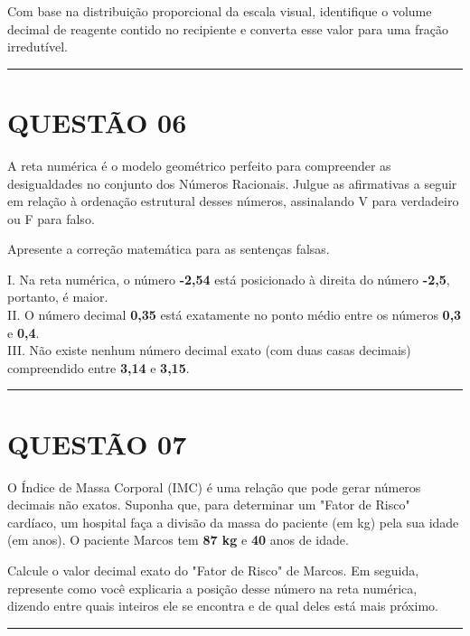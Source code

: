 \documentclass[12pt, a4paper]{article}
\begin{document}
Com base na distribuição proporcional da escala visual, identifique o volume decimal de reagente contido no recipiente e converta esse valor para uma fração irredutível.

\vspace{0.5cm} \noindent\rule{\textwidth}{0.4pt} \vspace{0.5cm}

\section*{QUESTÃO 06}

A reta numérica é o modelo geométrico perfeito para compreender as desigualdades no conjunto dos Números Racionais. Julgue as afirmativas a seguir em relação à ordenação estrutural desses números, assinalando V para verdadeiro ou F para falso.

Apresente a correção matemática para as sentenças falsas.

I. Na reta numérica, o número \textbf{-2,54} está posicionado à direita do número \textbf{-2,5}, portanto, é maior.\\[0.3cm]
II. O número decimal \textbf{0,35} está exatamente no ponto médio entre os números \textbf{0,3} e \textbf{0,4}.\\[0.3cm]
III. Não existe nenhum número decimal exato (com duas casas decimais) compreendido entre \textbf{3,14} e \textbf{3,15}.

\vspace{0.5cm} \noindent\rule{\textwidth}{0.4pt} \vspace{0.5cm}

\section*{QUESTÃO 07}

O Índice de Massa Corporal (IMC) é uma relação que pode gerar números decimais não exatos. Suponha que, para determinar um "Fator de Risco" cardíaco, um hospital faça a divisão da massa do paciente (em kg) pela sua idade (em anos). O paciente Marcos tem \textbf{87 kg} e \textbf{40} anos de idade.

Calcule o valor decimal exato do "Fator de Risco" de Marcos. Em seguida, represente como você explicaria a posição desse número na reta numérica, dizendo entre quais inteiros ele se encontra e de qual deles está mais próximo.

\vspace{0.5cm} \noindent\rule{\textwidth}{0.4pt} \vspace{0.5cm}
\end{document}

